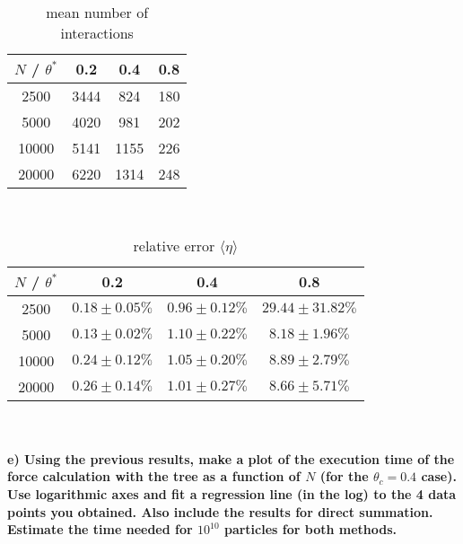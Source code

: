     \begin{table}[h!]
        \begin{center}
        \caption{mean number of interactions}
        \begin{tabular}{c | c | c | c}
            $N$ / $\theta^*$ & 0.2  & 0.4  & 0.8 \\
            \hline
            2500             & 3444 & 824  & 180 \\
            \hline
            5000             & 4020 & 981  & 202 \\
            \hline
            10000            & 5141 & 1155 & 226 \\
            \hline
            20000            & 6220 & 1314 & 248 \\
        \end{tabular}
        \end{center}
    \end{table} \ \\ 
    \begin{table}[h!]
        \begin{center}
            \caption{relative error $\langle\eta\rangle$}
            \begin{tabular}{c | c | c | c}
                $N$ / $\theta^*$ & 0.2             & 0.4             & 0.8 \\
                \hline
                2500             & $0.18\pm0.05\%$ & $0.96\pm0.12\%$ & $29.44\pm31.82\%$ \\
                \hline
                5000             & $0.13\pm0.02\%$ & $1.10\pm0.22\%$ & $8.18\pm1.96\%$ \\
                \hline
                10000            & $0.24\pm0.12\%$ & $1.05\pm0.20\%$ & $8.89\pm2.79\%$ \\
                \hline
                20000            & $0.26\pm0.14\%$ & $1.01\pm0.27\%$ & $8.66\pm5.71\%$ \\
            \end{tabular}
        \end{center}
    \end{table} \ \\ 

\newpage
\paragraph{e)
    Using the previous results, make a plot of the execution 
    time of the force calculation with the tree as a function of 
    $N$ (for the $\theta_c=0.4$ case). Use logarithmic axes and 
    fit a regression line (in the log) to the 4 data points you 
    obtained. Also include the results for direct summation. 
    Estimate the time needed for $10^{10}$ particles for both 
    methods.
}
